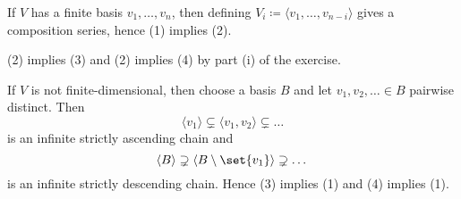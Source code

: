 If $V$ has a finite basis $v_1, \ldots, v_n$, then
defining  $V_i\coloneqq \langle v_1, \ldots, v_{n-i}\rangle$ gives a composition
series, hence (1) implies (2).

(2) implies (3) and (2) implies (4) by part (i) of the exercise.

If $V$ is not finite-dimensional, then choose a basis $B$ and let
$v_1, v_2, \ldots \in B$ pairwise distinct. Then
\[ \langle v_1 \rangle \subsetneq \langle v_1, v_2 \rangle \subsetneq \dots \] is
an infinite strictly ascending chain and
\[ \langle B \rangle \supsetneq \langle B\setminus\set{v_1}\rangle \supsetneq \dots \]
is an infinite strictly descending chain. Hence (3) implies (1) and (4) implies (1).
